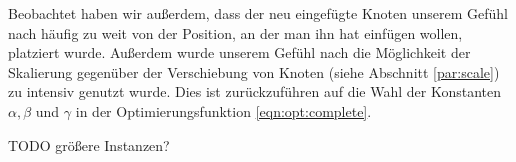 Beobachtet haben wir außerdem, dass der neu eingefügte Knoten unserem Gefühl nach häufig zu weit von der Position, an der man ihn hat einfügen wollen, platziert wurde. Außerdem wurde unserem Gefühl nach die Möglichkeit der Skalierung gegenüber der Verschiebung von Knoten (siehe Abschnitt \ref{par:scale}) zu intensiv genutzt wurde. Dies ist zurückzuführen auf die Wahl der Konstanten $\alpha, \beta$ und $\gamma$ in der Optimierungsfunktion \ref{eqn:opt:complete}.



TODO größere Instanzen?
